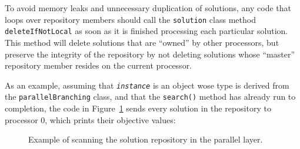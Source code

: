 To avoid memory leaks and unnecessary duplication of solutions, any
code that loops over repository members should call the
\texttt{solution} class method \texttt{deleteIfNotLocal} as soon as it
is finished processing each particular solution.  This method will
delete solutions that are ``owned'' by other processors, but preserve
the integrity of the repository by not deleting solutions whose
``master'' repository member resides on the current processor.

As an example, assuming that \texttt{\emph{instance}} is an object
wose type is derived from the \texttt{parallelBranching} class, and
that the \texttt{search()} method has already run to completion, the
code in Figure~\ref{fig:parreposscan} sends every solution in the
repository to processor $0$, which prints their objective values:

\begin{figure}[tbp]
\begin{center}
\end{center}
\vspace{-2ex}
\caption{Example of scanning the solution repository in the parallel layer.}
\label{fig:parreposscan}
\end{figure}

